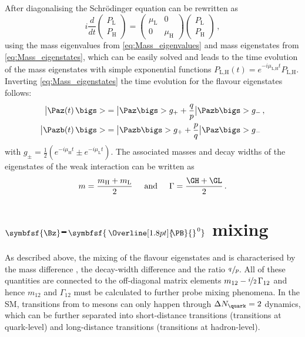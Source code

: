 After diagonalising the Schrödinger equation can be rewritten as
\begin{equation}
i\frac{d}{d{}t}\begin{pmatrix} P_\text{L} \\ P_\text{H} \end{pmatrix} = \begin{pmatrix} \mu_\text{L} & 0 \\ 0 & \mu_\text{H} \end{pmatrix}\begin{pmatrix} P_\text{L} \\ P_\text{H} \end{pmatrix}\,,
\end{equation}
using the mass eigenvalues from \cref{eq:Mass_eigenvalues} and mass eigenstates from \cref{eq:Mass_eigenstates}, which can be easily solved and leads to the time evolution of the mass eigenstates with simple exponential functions $P_\text{L,H}(t)=e^{-i\mu_\text{L,H}t}P_\text{L,H}$.
Inverting \cref{eq:Mass_eigenstates} the time evolution for the flavour eigenstates follows:
\begin{equation}
\begin{split}
\big|\Paz\!\left(t\right)\bigs>&=\big|\Paz\bigs> g_++\frac{q}{p}\big|\Pazb\bigs>g_-\,,\\
\big|\Pazb\!\left(t\right)\bigs>&=\big|\Pazb\bigs>g_++\frac{p}{q}\big|\Paz\bigs>g_-\label{eq:timeEvolution}
\end{split}
\end{equation}
with $g_\pm=\frac{1}{2}\left(e^{-i\mu_\text{H}t}\pm e^{-i\mu_\text{L}t}\right)$.
The associated masses and decay widths of the eigenstates of the weak interaction can be written as
\begin{equation}
m=\frac{m_\text{H}+m_\text{L}}{2}\hspace{0.5cm}\text{and}\hspace{0.5cm}\Gamma=\frac{\GH+\GL}{2}\,.
\end{equation}

\section[head={\Bz-\Bzb mixing},tocentry={\Bz-\Bzb mixing}]{$\symbfsf{\Bz}$-$\symbfsf{\kern 0.2em\Overline[1.8pt]{\kern -0.25em \PB}{}^{\kern 0.1em 0}}$ mixing}
\label{sec:BBbarMixing}

As described above, the mixing of the flavour eigenstates \Bq and \Bqb is characterised by the mass difference \dm, the decay-width difference \DG and the ratio $\nicefrac{q\,}{p}$.
All of these quantities are connected to the off-diagonal matrix elements $m_{12}-\nicefrac{i}{2}\,\Gamma_{12}$ and hence $m_{12}$ and $\Gamma_{12}$ must be calculated to further probe mixing phenomena.
In the \ac{SM}, transitions from \Bq to \Bqb mesons can only happen through $\Delta N_\quark=2$ dynamics, which can be further separated into short-distance transitions (transitions at quark-level) and long-distance transitions (transitions at hadron-level).

